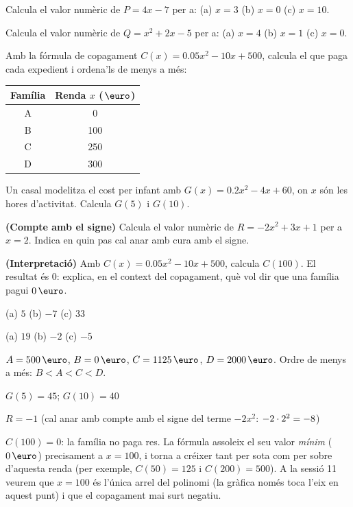 \begin{exercicis}
\begin{exlist}
  \item Calcula el valor numèric de $P = 4x - 7$ per a:
        \quad (a) $x=3$ \quad (b) $x=0$ \quad (c) $x=10$.
  \item Calcula el valor numèric de $Q = x^2 + 2x - 5$ per a:
        \quad (a) $x=4$ \quad (b) $x=1$ \quad (c) $x=0$.
  \item Amb la fórmula de copagament $C(x)=\num{0,05}x^2-10x+500$, calcula el que
        paga cada expedient i ordena'ls de menys a més:
    \begin{center}
    \begin{tabular}{c c}
    \toprule
    Família & Renda $x$ ($\eur$) \\
    \midrule
    A & 0 \\
    B & 100 \\
    C & 250 \\
    D & 300 \\
    \bottomrule
    \end{tabular}
    \end{center}
  \item Un casal modelitza el cost per infant amb $G(x) = \num{0,2}x^2 - 4x + 60$,
        on $x$ són les hores d'activitat. Calcula $G(5)$ i $G(10)$.
  \item \textbf{(Compte amb el signe)} Calcula el valor numèric de
        $R = -2x^2 + 3x + 1$ per a $x=2$. Indica en quin pas cal anar amb cura
        amb el signe.
  \item \textbf{(Interpretació)} Amb $C(x)=\num{0,05}x^2-10x+500$, calcula
        $C(100)$. El resultat és $0$: explica, en el context del copagament,
        què vol dir que una família pagui $0\eur$.
\end{exlist}
\end{exercicis}

\begin{solucions}
\begin{sollist}
  \item (a) $5$ \quad (b) $-7$ \quad (c) $33$
  \item (a) $19$ \quad (b) $-2$ \quad (c) $-5$
  \item $A=500\eur$, \;$B=0\eur$, \;$C=\num{1125}\eur$, \;$D=\num{2000}\eur$. \;
        Ordre de menys a més: $B<A<C<D$.
  \item $G(5)=45$; \quad $G(10)=40$
  \item $R=-1$ \;(cal anar amb compte amb el signe del terme $-2x^2$:
        $-2\cdot 2^2=-8$)
  \item $C(100)=0$: la família no paga res. La fórmula assoleix el seu valor
        \emph{mínim} ($0\eur$) precisament a $x=100$, i torna a créixer tant per
        sota com per sobre d'aquesta renda (per exemple, $C(50)=125$ i $C(200)=500$).
        A la sessió 11 veurem que $x=100$ és l'única arrel del polinomi (la gràfica
        només toca l'eix en aquest punt) i que el copagament mai surt negatiu.
\end{sollist}
\end{solucions}
